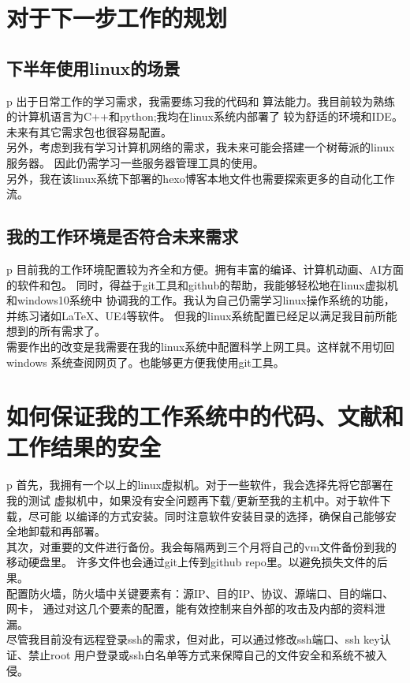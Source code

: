 \documentclass{ctexart}
\begin{document}
    \section{对于下一步工作的规划}\label{S3}
    \subsection{下半年使用linux的场景}\label{S3.1}
    \begin{tabular}{p\columnwidth}
        出于日常工作的学习需求，我需要练习我的代码和
        算法能力。我目前较为熟练的计算机语言为C++和python;我均在linux系统内部署了
        较为舒适的环境和IDE。未来有其它需求包也很容易配置。\\
        另外，考虑到我有学习计算机网络的需求，我未来可能会搭建一个树莓派的linux服务器。
        因此仍需学习一些服务器管理工具的使用。\cite{RaspberryPie}\\
        另外，我在该linux系统下部署的hexo博客本地文件也需要探索更多的自动化工作流。
    \end{tabular}
    \subsection{我的工作环境是否符合未来需求}\label{S3.2}
    \begin{tabular}{p\columnwidth}
        目前我的工作环境配置较为齐全和方便。拥有丰富的编译、计算机动画、AI方面的软件和包。
        同时，得益于git工具和github的帮助，我能够轻松地在linux虚拟机和windows10系统中
        协调我的工作。我认为自己仍需学习linux操作系统的功能，并练习诸如LaTeX、UE4等软件。
        但我的linux系统配置已经足以满足我目前所能想到的所有需求了。\\
        需要作出的改变是我需要在我的linux系统中配置科学上网工具。这样就不用切回windows
        系统查阅网页了。也能够更方便我使用git工具。
    \end{tabular}
    \section{如何保证我的工作系统中的代码、文献和工作结果的安全}\label{S4}
    \begin{tabular}{p\columnwidth}
        首先，我拥有一个以上的linux虚拟机。对于一些软件，我会选择先将它部署在我的测试
        虚拟机中，如果没有安全问题再下载/更新至我的主机中。对于软件下载，尽可能
        以编译的方式安装。同时注意软件安装目录的选择，确保自己能够安全地卸载和再部署。\\
        其次，对重要的文件进行备份。我会每隔两到三个月将自己的vm文件备份到我的移动硬盘里。
        许多文件也会通过git上传到github repo里。以避免损失文件的后果。\\
        配置防火墙，防火墙中关键要素有：源IP、目的IP、协议、源端口、目的端口、网卡，
        通过对这几个要素的配置，能有效控制来自外部的攻击及内部的资料泄漏。\\
        尽管我目前没有远程登录ssh的需求，但对此，可以通过修改ssh端口、ssh key认证、禁止root
        用户登录或ssh白名单等方式来保障自己的文件安全和系统不被入侵。\cite{OnlineSafe}
    \end{tabular}
    
\end{document}
